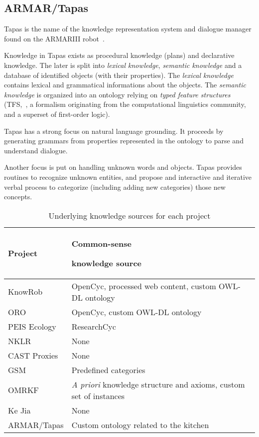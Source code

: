 \subsection{ARMAR/Tapas}

{\sc Tapas} is the name of the knowledge representation system and dialogue
manager found on the ARMARIII robot~\cite{Holzapfel2008}.

Knowledge in {\sc Tapas} exists as procedural knowledge (plans) and declarative
knowledge. The later is split into \emph{lexical knowledge}, \emph{semantic
knowledge} and a database of identified objects (with their properties). The
\emph{lexical knowledge} contains lexical and grammatical informations about
the objects. The \emph{semantic knowledge} is organized into an ontology
relying on \emph{typed feature structures} (TFS,~\cite{Carpenter1992}, a
formalism originating from the computational linguistics community, and a
superset of first-order logic).

{\sc Tapas} has a strong focus on natural language grounding. It proceeds by
generating grammars from properties represented in the ontology to parse and
understand dialogue.

Another focus is put on handling unknown words and objects. {\sc Tapas}
provides routines to recognize unknown entities, and propose and interactive
and iterative verbal process to categorize (including adding new categories)
those new concepts.

\begin{table}
\begin{center}

\begin{tabular}{lp{4cm}}
\toprule
{\bf Project} & {\bf Common-sense \par knowledge source} \\
\midrule
{\sc KnowRob} & {\sc OpenCyc}, processed web content, custom OWL-DL ontology \\
ORO & {\sc OpenCyc}, custom OWL-DL ontology \\
PEIS Ecology & {\sc ResearchCyc} \\
NKLR &  None \\
CAST Proxies &  None \\
GSM &  Predefined categories \\
OMRKF & {\it A priori} knowledge structure and axioms, custom set of instances\\
Ke Jia & None \\
ARMAR/{\sc Tapas} & Custom ontology related to the kitchen\\

\bottomrule

\end{tabular}
\end{center}
\caption{Underlying knowledge sources for each project}
\label{table|knowledge-sources}
\end{table}



